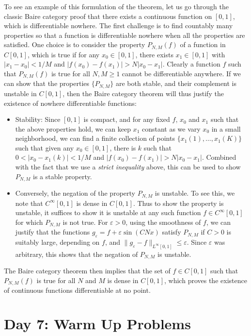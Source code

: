 \documentclass[answers]{exam}
\begin{document}
\begin{questions}
To see an example of this formulation of the theorem, let us go through the classic Baire category proof that there exists a continuous function on $[0,1]$, which is differentiable nowhere. The first challenge is to find countably many properties so that a function is differentiable nowhere when all the properties are satisfied. One choice is to consider the property $P_{N,M}(f)$ of a function in $C[0,1]$, which is true if for any $x_0 \in [0,1]$, there exists $x_1 \in [0,1]$ with $|x_1 - x_0| < 1/M$ and $|f(x_0) - f(x_1)| > N|x_0 - x_1|$. Clearly a function $f$ such that $P_{N,M}(f)$ is true for all $N,M \geq 1$ cannot be differentiable anywhere. If we can show that the properties $\{ P_{N,M} \}$ are both stable, and their complement is unstable in $C[0,1]$, then the Baire category theorem will thus justify the existence of nowhere differentiable functions:
%
\begin{itemize}
	\item Stability: Since $[0,1]$ is compact, and for any fixed $f$, $x_0$ and $x_1$ such that the above properties hold, we can keep $x_1$ constant as we vary $x_0$ in a small neighborhood, we can find a finite collection of points $\{ x_1(1),\dots, x_1(K) \}$ such that given any $x_0 \in [0,1]$, there is $k$ such that $0 < |x_0 - x_1(k)| < 1/M$ and $|f(x_0) - f(x_1)| > N|x_0 - x_1|$. Combined with the fact that we use a \emph{strict inequality} above, this can be used to show $P_{N,M}$ is a stable property.

	\item Conversely, the negation of the property $P_{N,M}$ is unstable. To see this, we note that $C^\infty[0,1]$ is dense in $C[0,1]$. Thus to show the property is unstable, it suffices to show it is unstable at any such function $f \in C^\infty[0,1]$ for which $P_{N,M}$ is not true. For $\varepsilon > 0$, using the smoothness of $f$, we can justify that the functions $g_\varepsilon = f + \varepsilon \sin(C Nx)$ satisfy $P_{N,M}$ if $C > 0$ is suitably large, depending on $f$, and $\| g_\varepsilon - f \|_{L^\infty[0,1]} \leq \varepsilon$. Since $\varepsilon$ was arbitrary, this shows that the negation of $P_{N,M}$ is unstable.
\end{itemize}
%
The Baire category theorem then implies that the set of $f \in C[0,1]$ such that $P_{N,M}(f)$ is true for all $N$ and $M$ is dense in $C[0,1]$, which proves the existence of continuous functions differentiable at no point.




\newpage
\section{Day 7: Warm Up Problems}


\end{questions}
\end{document}
